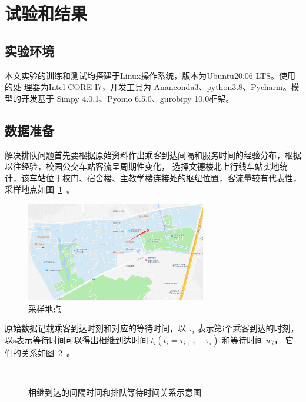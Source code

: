 \section{试验和结果}
\subsection{实验环境}
本文实验的训练和测试均搭建于Linux操作系统，版本为Ubuntu20.06 LTS。使用的处
理器为Intel CORE I7，开发工具为 Ananconda3、python3.8、Pycharm。模型的开发基于
Simpy 4.0.1、Pyomo 6.5.0、gurobipy 10.0框架。

\subsection{数据准备}
解决排队问题首先要根据原始资料作出乘客到达间隔和服务时间的经验分布，根据以往经验，校园公交车站客流呈周期性变化，
选择文德楼北上行线车站实地统计，该车站位于校门、宿舍楼、主教学楼连接处的枢纽位置，客流量较有代表性，采样地点如图~\ref{fig31}~。
\\
\begin{figure}[htbp!]
    \centering
    \includegraphics[width=0.7\textwidth]{figs/chap03/map.png}
    \caption{采样地点}
    \label{fig31}
\end{figure}

原始数据记载乘客到达时刻和对应的等待时间，以 $\tau_i$ 表示第i个乘客到达的时刻，以s表示等待时间可以得出相继到达时间 $t_i \left(t_i = \tau_{i+1} - \tau_i\right)$ 和等待时间 $w_i$，
它们的关系如图~\ref{fig32}~。

\begin{figure}[htbp!]
    \center
    \\
    \caption{相继到达的间隔时间和排队等待时间关系示意图}\label{fig32}
\end{figure}

